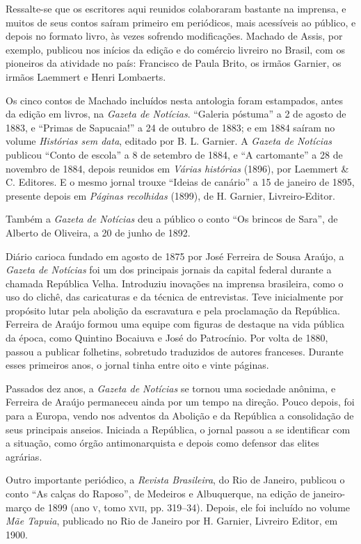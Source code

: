 Ressalte-se que os escritores aqui reunidos colaboraram bastante na
imprensa, e muitos de seus contos saíram primeiro em periódicos, mais
acessíveis ao público, e depois no formato livro, às vezes sofrendo
modificações. Machado de Assis, por exemplo, publicou nos inícios da
edição e do comércio livreiro no Brasil, com os pioneiros da atividade
no país: Francisco de Paula Brito, os irmãos Garnier, os irmãos Laemmert
e Henri Lombaerts.

Os cinco contos de Machado incluídos nesta antologia foram estampados,
antes da edição em livros, na \emph{Gazeta de Notícias}. ``Galeria
póstuma'' a 2 de agosto de 1883, e ``Primas de Sapucaia!'' a 24 de
outubro de 1883; e em 1884 saíram no volume \emph{Histórias sem data},
editado por B. L. Garnier. A \emph{Gazeta de Notícias} publicou ``Conto
de escola'' a 8 de setembro de 1884, e ``A cartomante'' a 28 de novembro
de 1884, depois reunidos em \emph{Várias histórias} (1896), por Laemmert
\& C. Editores. E o mesmo jornal trouxe ``Ideias de canário'' a 15 de
janeiro de 1895, presente depois em \emph{Páginas recolhidas} (1899), de
H. Garnier, Livreiro-Editor.

Também a \emph{Gazeta de Notícias} deu a público o conto ``Os brincos de
Sara'', de Alberto de Oliveira, a 20 de junho de 1892.

Diário carioca fundado em agosto de 1875 por José Ferreira de Sousa
Araújo, a \emph{Gazeta de Notícias} foi um dos principais jornais da
capital federal durante a chamada República Velha. Introduziu inovações
na imprensa brasileira, como o uso do clichê, das caricaturas e da
técnica de entrevistas. Teve inicialmente por propósito lutar pela
abolição da escravatura e pela proclamação da República. Ferreira de
Araújo formou uma equipe com figuras de destaque na vida pública da
época, como Quintino Bocaiuva e José do Patrocínio. Por volta de 1880,
passou a publicar folhetins, sobretudo traduzidos de autores franceses.
Durante esses primeiros anos, o jornal tinha entre oito e vinte páginas.

Passados dez anos, a \emph{Gazeta de Notícias} se tornou uma sociedade
anônima, e Ferreira de Araújo permaneceu ainda por um tempo na direção.
Pouco depois, foi para a Europa, vendo nos adventos da Abolição e da
República a consolidação de seus principais anseios. Iniciada a
República, o jornal passou a se identificar com a situação, como órgão
antimonarquista e depois como defensor das elites agrárias.

Outro importante periódico, a \emph{Revista Brasileira}, do Rio de
Janeiro, publicou o conto ``As calças do Raposo'', de Medeiros e
Albuquerque, na edição de janeiro-março de 1899 (ano \textsc{v}, tomo \textsc{xvii}, pp.
319--34). Depois, ele foi incluído no volume \emph{Mãe Tapuia}, publicado
no Rio de Janeiro por H. Garnier, Livreiro Editor, em 1900.

